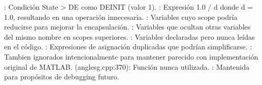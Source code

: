 {}: Condición State\markdownRendererUnderscore{} > DE como DE\markdownRendererUnderscore{}INIT (valor 1).\markdownRendererInterblockSeparator
{}: Expresión 1.0 / d donde d = 1.0, resultando en una operación innecesaria.\markdownRendererInterblockSeparator
{}: Variables cuyo scope podría reducirse para mejorar la encapsulación.\markdownRendererInterblockSeparator
{}: Variables que ocultan otras variables del mismo nombre en scopes superiores.\markdownRendererInterblockSeparator
{}: Variables declaradas pero nunca leídas en el código.\markdownRendererInterblockSeparator
{}: Expresiones de asignación duplicadas que podrían simplificarse.\markdownRendererInterblockSeparator
{}: Tambien ignorados intencionalmente para mantener parecido con implementación original de MATLAB.\markdownRendererInterblockSeparator
{}
\markdownRendererSectionEnd \markdownRendererSectionBegin
{}\markdownRendererInterblockSeparator
{}
\markdownRendererSectionEnd \markdownRendererSectionBegin
{}\markdownRendererInterblockSeparator
{}\markdownRendererUlBeginTight
\markdownRendererUlItem {} (anglesg.cpp:370): Función  nunca utilizada.\markdownRendererUlItemEnd 
\markdownRendererUlEndTight \markdownRendererInterblockSeparator
{}: Mantenida para propósitos de debugging futuro.
\markdownRendererSectionEnd 
\markdownRendererSectionEnd 
\markdownRendererSectionEnd \markdownRendererDocumentEnd